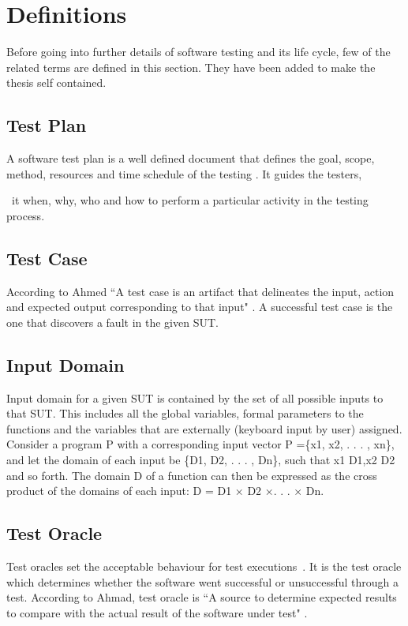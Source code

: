 \section{Definitions}
Before going into further details of software testing and its life cycle, few of the related terms are defined in this section. They have been added to make the thesis self contained.

\subsection{Test Plan}
A software test plan is a well defined document that defines the goal, scope, method, resources and time schedule of the testing \cite{futrell2001quality}. It guides the testers, {\ it {when, why, who and how} to perform a particular activity in the testing process. 

\subsection{Test Case}
According to Ahmed ``A test case is an artifact that delineates the input, action and expected output corresponding to that input" \cite{ahmed2010software}. A successful test case is the one that discovers a fault in the given SUT.

\subsection{Input Domain} 
Input domain for a given SUT is contained by the set of all possible inputs to that SUT. This includes all the global variables, formal parameters to the functions and the variables that are externally (keyboard input by user) assigned. Consider a program P with a corresponding input vector P =\{x1, x2, . . . , xn\}, and let the domain of each input be \{D1, D2, . . . , Dn\}, such that x1 \in D1,x2 \in D2 and so forth. The domain D of a function can then be expressed as the cross product of the domains of each input: D = D1 × D2 ×. . . × Dn.

\subsection{Test Oracle}
Test oracles set the acceptable behaviour for test executions~\cite{baresi2001test}. It is the test oracle which determines whether the software went successful or unsuccessful through a test. According to Ahmad, test oracle is ``A source to determine expected results to compare with the actual result of the software under test" \cite{ahmed2010software}.

}

